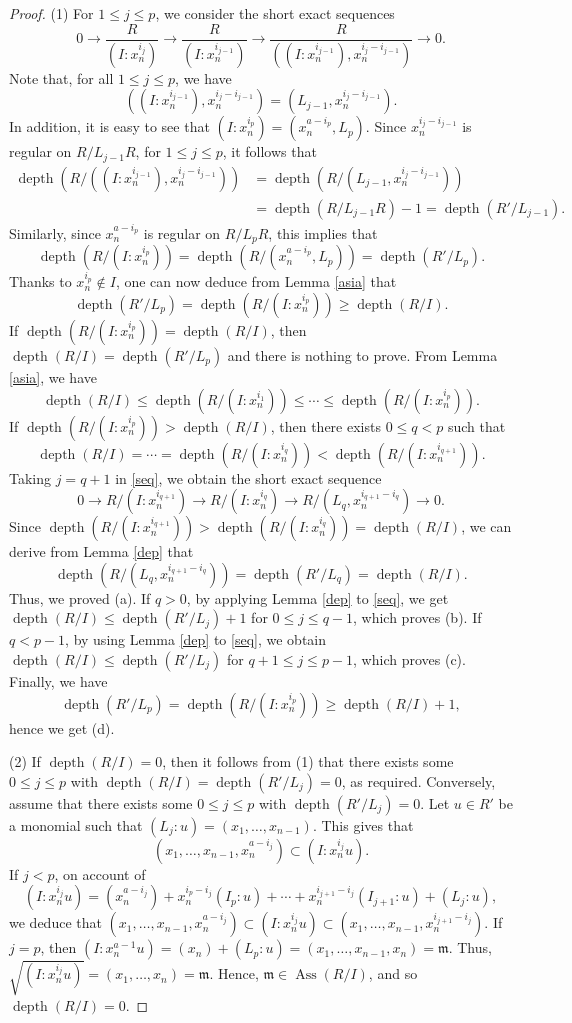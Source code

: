 \documentclass[11pt]{amsart}
\def\Ass{\operatorname{Ass}}
\def\depth{\operatorname{depth}}
\begin{document}
\begin{proof}
(1) For $1\leq j\leq p$, we consider the short exact sequences
\begin{equation}\label{seq}
0 \to \frac{R}{(I:x_n^{i_j})} \to \frac{R}{(I:x_n^{i_{j-1}})} \to \frac{R}{((I:x_n^{i_{j-1}}),x_n^{i_j-i_{j-1}})} \to 0.
\end{equation}
Note that, for all $1\leq j\leq p$, we have
 $$((I:x_n^{i_{j-1}}),x_n^{i_j-i_{j-1}})=(L_{j-1},x_n^{i_j-i_{j-1}}).$$
In addition, it is easy to see that  $(I:x_n^{i_p})=(x_n^{a-i_p},L_p)$. 
 Since $x_n^{i_j-i_{j-1}}$ is regular on $R/L_{j-1}R$, for $1\leq j\leq p$, it follows that 
\begin{align*}
\depth(R/((I:x_n^{i_{j-1}}),x_n^{i_j-i_{j-1}})) &= \depth(R/(L_{j-1},x_n^{i_j-i_{j-1}})) \\
 &= \depth(R/L_{j-1}R)-1=\depth(R'/L_{j-1}).
\end{align*}
Similarly, since $x_n^{a-i_p}$ is regular on $R/L_pR$, this implies that 
$$\depth(R/(I:x_n^{i_p}))=\depth(R/(x_n^{a-i_p},L_p)) = \depth(R'/L_p).$$
 Thanks to  $x_n^{i_p} \notin I$, one can now deduce from Lemma \ref{asia}  that 
$$\depth(R'/L_p)=\depth(R/(I:x_n^{i_p}))\geq \depth(R/I).$$
If $\depth(R/(I:x_n^{i_p}))=\depth(R/I)$, then $\depth(R/I)=\depth(R'/L_p)$ and there is nothing to prove. 
From Lemma \ref{asia}, we have 
$$\depth(R/I)\leq \depth(R/(I:x_n^{i_1}))\leq \cdots \leq \depth(R/(I:x_n^{i_p})).$$
If  $\depth(R/(I:x_n^{i_p}))>\depth(R/I)$, then  there exists $0\leq q<p$ such that
$$\depth(R/I)=\cdots=\depth(R/(I:x_n^{i_q}))<\depth(R/(I:x_n^{i_{q+1}})).$$
Taking $j=q+1$ in \eqref{seq}, we obtain the short exact sequence
$$0\to R/(I:x_n^{i_{q+1}}) \to R/(I:x_n^{i_{q}}) \to R/(L_q,x_n^{i_{q+1}-i_q}) \to 0.$$
Since $\depth(R/(I:x_n^{i_{q+1}}))>\depth(R/(I:x_n^{i_{q}}))=\depth(R/I)$, we can derive from   Lemma \ref{dep} that 
$$\depth(R/(L_q,x_n^{i_{q+1}-i_q}))=\depth(R'/L_q)=\depth(R/I).$$
Thus, we proved (a).  If $q>0$, by  applying  Lemma \ref{dep} to \eqref{seq},  we get $\depth(R/I)\leq \depth(R'/L_j)+1$ for $0\leq j\leq q-1$, 
which proves (b).  If $q<p-1$, by using  Lemma \ref{dep} to \eqref{seq},  we obtain  $\depth(R/I)\leq \depth(R'/L_j)$  for $q+1\leq j\leq p-1$, 
which proves (c). 
Finally, we have $$\depth(R'/L_p)=\depth(R/(I:x_n^{i_p}))\geq \depth(R/I)+1,$$ hence we get (d).

(2) If $\depth(R/I)=0$, then  it follows from (1) that there exists some $0\leq j\leq p$ with $\depth(R/I)=\depth(R'/L_j)=0$, as required.
    Conversely, assume that there exists some $0\leq j\leq p$ with $\depth(R'/L_j)=0$. Let $u\in R'$ be a monomial such that
		$(L_j:u)=(x_1,\ldots,x_{n-1})$. This gives  that  $$(x_1,\ldots,x_{n-1},x_n^{a-i_j}) \subset (I:x_n^{i_j}u).$$ 
 If  $j<p$, on account of  $$(I:x_n^{i_j}u) = (x_n^{a-i_j})+x_n^{i_p-i_j}(I_p:u)+\cdots+x_n^{i_{j+1}-i_{j}}(I_{j+1}:u)+(L_j:u),$$
	we  deduce that   $(x_1,\ldots,x_{n-1},x_n^{a-i_j}) \subset (I:x_n^{i_j}u)\subset (x_1,\ldots,x_{n-1},x_n^{i_{j+1}-i_j}).$ 
If $j=p$, then $(I:x_n^{a-1}u) = (x_n) + (L_p:u) = (x_1,\ldots, x_{n-1},x_n)=\mathfrak{m}$. 
	Thus,  $\sqrt{(I:x_n^{i_j}u)}=(x_1,\ldots,x_n)=\mathfrak m$. Hence, $\mathfrak m\in \Ass(R/I)$, and  so  $\depth(R/I)=0$.
		\end{proof}
\end{document}
